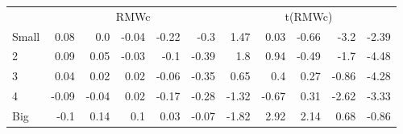 \begin{table}[!ht]
\begin{tabular}{lrrrrrrrrrr}
  

      & \multicolumn{5}{c}{RMWc} & \multicolumn{5}{c}{t(RMWc)} \\
    \cmidrule(r){2-6} \cmidrule(r){7-11}
      Small  & 0.08  & 0.0  & -0.04  & -0.22  & -0.3   & 1.47  & 0.03  & -0.66  & -3.2  & -2.39  \\
          2  & 0.09  & 0.05  & -0.03  & -0.1  & -0.39   & 1.8  & 0.94  & -0.49  & -1.7  & -4.48  \\
          3  & 0.04  & 0.02  & 0.02  & -0.06  & -0.35   & 0.65  & 0.4  & 0.27  & -0.86  & -4.28  \\
          4  & -0.09  & -0.04  & 0.02  & -0.17  & -0.28   & -1.32  & -0.67  & 0.31  & -2.62  & -3.33  \\
      Big    & -0.1  & 0.14  & 0.1  & 0.03  & -0.07   & -1.82  & 2.92  & 2.14  & 0.68  & -0.86  \\

  

  \bottomrule
\end{tabular}
\label{tbl:25_Size_Vol}
\end{table}